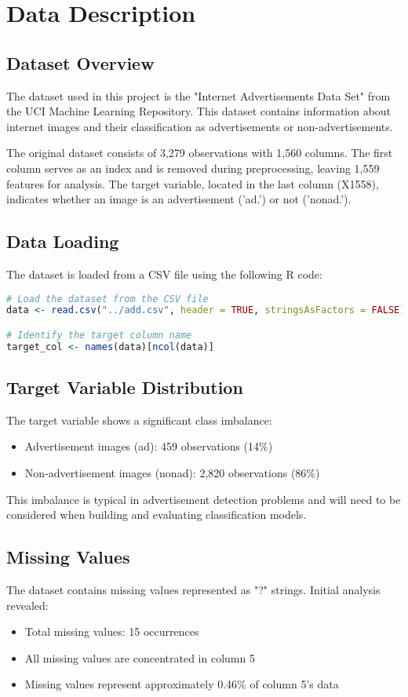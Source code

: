 \section{Data Description}
\label{sec:data_description}

\subsection{Dataset Overview}
The dataset used in this project is the "Internet Advertisements Data Set" from the UCI Machine Learning Repository. This dataset contains information about internet images and their classification as advertisements or non-advertisements.

The original dataset consists of 3,279 observations with 1,560 columns. The first column serves as an index and is removed during preprocessing, leaving 1,559 features for analysis. The target variable, located in the last column (X1558), indicates whether an image is an advertisement ('ad.') or not ('nonad.').

\subsection{Data Loading}
The dataset is loaded from a CSV file using the following R code:

\begin{lstlisting}[language=R]
# Load the dataset from the CSV file
data <- read.csv("../add.csv", header = TRUE, stringsAsFactors = FALSE)

# Identify the target column name
target_col <- names(data)[ncol(data)]
\end{lstlisting}

\subsection{Target Variable Distribution}
The target variable shows a significant class imbalance:
\begin{itemize}
    \item Advertisement images (ad): 459 observations (14\%)
    \item Non-advertisement images (nonad): 2,820 observations (86\%)
\end{itemize}

This imbalance is typical in advertisement detection problems and will need to be considered when building and evaluating classification models.

\subsection{Missing Values}
The dataset contains missing values represented as "?" strings. Initial analysis revealed:
\begin{itemize}
    \item Total missing values: 15 occurrences
    \item All missing values are concentrated in column 5
    \item Missing values represent approximately 0.46\% of column 5's data
\end{itemize}

